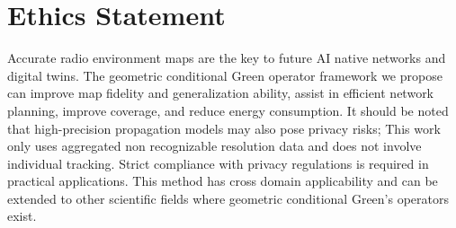 \documentclass{article}
\begin{document}
\section*{Ethics Statement}
Accurate radio environment maps are the key to future AI native networks and digital twins. The geometric conditional Green operator framework we propose can improve map fidelity and generalization ability, assist in efficient network planning, improve coverage, and reduce energy consumption. It should be noted that high-precision propagation models may also pose privacy risks; This work only uses aggregated non recognizable resolution data and does not involve individual tracking. Strict compliance with privacy regulations is required in practical applications. This method has cross domain applicability and can be extended to other scientific fields where geometric conditional Green's operators exist.




%
\end{document}
